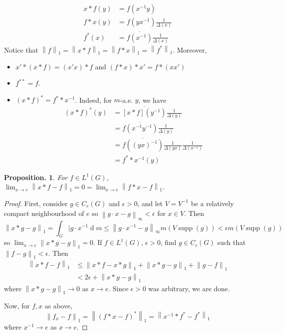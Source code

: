 \documentclass[11pt, a4paper]{memoir}
\newcommand{\norm}[1]{\ensuremath{\left\lVert#1\right\rVert}}
\theoremstyle{change}
\newtheorem{proposition}[theorem]{Proposition.}
\theoremstyle{plain}
\theoremstyle{nonumberplain}
\newtheorem{proof}{Proof}
\DeclareMathOperator{\supp}{supp}
\renewcommand{\d}[1]{\ensuremath{\operatorname{d}\!{#1}}}
\numberwithin{equation}{section}
\begin{document}
\begin{align*}
    x*f(y)&=f(x^{-1}y)\\
    f*x(y)&=f(yx^{-1})\frac{1}{\Delta(x)}\\
    f^*(x)&=\overline{f(x^{-1})}\frac{1}{\Delta(x)}
\end{align*}
Notice that $\norm{f}_1=\norm{x*f}_1=\norm{f*x}_1=\norm{f^*}_1$.
Moreover,
\begin{itemize}[nl]
    \item $x'*(x*f)=(x'x)*f$ and $(f*x)*x'=f*(xx')$
    \item $f^{**}=f$.
    \item $(x*f)^*=f^**x^{-1}$.
        Indeed, for $m$-a.e. $y$, we have
        \begin{align*}
            (x*f)^*(y) &= \overline{[x*f](y^{-1})}\frac{1}{\Delta(y)}\\
                       &= \overline{f(x^{-1}y^{-1})}\frac{1}{\Delta(y)}\\
                       &= \overline{f((yx)^{-1})}\frac{1}{\Delta(yx)}\frac{1}{\Delta(x^{-1})}\\
                       &= f^**x^{-1}(y)
        \end{align*}
\end{itemize}
\begin{proposition}
    For $f\in L^1(G)$, $\lim_{x\to e}\norm{x*f-f}_1=0=\lim_{x\to e}\norm{f*x-f}_1$.
\end{proposition}
\begin{proof}
    First, consider $g\in C_c(G)$ and $\epsilon>0$, and let $V=V^{-1}$ be a relatively compact neighbourhood of $e$ so $\norm{g\cdot x-g}_\infty<\epsilon$ for $x\in V$.
    Then
    \begin{equation*}
        \norm{x*g-g}_1=\int_G|g\cdot x^{-1}\d{m}\leq\norm{g\cdot x^{-1}-g}_\infty m(V\supp(g))<\epsilon m(V\supp(g))
    \end{equation*}
    so $\lim_{x\to e}\norm{x*g-g}_1=0$.
    If $f\in L^1(G)$, $\epsilon>0$, find $g\in C_c(G)$ such that $\norm{f-g}_1<\epsilon$.
    Then
    \begin{align*}
        \norm{x*f-f}_1 &\leq \norm{x*f-x*g}_1+\norm{x*g-g}_1+\norm{g-f}_1\\
                       &<2\epsilon+\norm{x*g-g}_1
    \end{align*}
    where $\norm{x*g-g}_1\to 0$ as $x\to e$.
    Since $\epsilon>0$ was arbitrary, we are done.

    Now, for $f,x$ as above,
    \begin{equation*}
        \norm{f_x-f}_1=\norm{(f*x-f)^*}_1=\norm{x^{-1}*f^*-f^*}_1
    \end{equation*}
    where $x^{-1}\to e$ as $x\to e$.
\end{proof}
\end{document}
